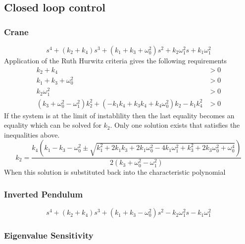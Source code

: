 \documentclass{article}
\begin{document}
\subsection{Closed loop control}


\subsubsection{Crane}


\begin{equation}
  s^{4} + \left(k_{2} + k_{4}\right) s^{3} + \left(k_{1} + k_{3} + \omega_{0}^{2}\right) s^{2} + k_{2} \omega_{1}^{2} s + k_{1} \omega_{1}^{2}
\end{equation}
Application of the Ruth Hurwitz criteria gives the following requirements
\begin{align}
  k_{2} + k_{4} &> 0 \\
  k_{1} + k_{3} + \omega_{0}^{2} &> 0 \\
  k_{2} \omega_{1}^{2} &> 0 \\
  \left(k_{3} + \omega_{0}^{2} - \omega_{1}^{2}\right) k_{2}^{2} + \left(- k_{1} k_{4} + k_{3} k_{4} + k_{4} \omega_{0}^{2}\right) k_{2} -  k_{1} k_{4}^{2} &> 0
\end{align}
If the system is at the limit of instablility then the last equality becomes an equality which can be solved for $k_2$. Only one solution exists that satisfies the inequalities above.
\begin{equation}
  k_2 = \frac{k_{4} \left(k_{1} - k_{3} - \omega_{0}^{2} \pm \sqrt{k_{1}^{2} + 2 k_{1} k_{3} + 2 k_{1} \omega_{0}^{2} - 4 k_{1} \omega_{1}^{2} + k_{3}^{2} + 2 k_{3} \omega_{0}^{2} + \omega_{0}^{4}}\right)}{2 \left(k_{3} + \omega_{0}^{2} - \omega_{1}^{2}\right)}
\end{equation}
When this solution is substituted back into the characteristic polynomial

\subsubsection{Inverted Pendulum}

\begin{equation}
  s^{4} + \left(k_{2} + k_{4}\right) s^{3} + \left(k_{1} + k_{3} - \omega_{0}^{2}\right) s^{2} -  k_{2} \omega_{1}^{2} s -  k_{1} \omega_{1}^{2}
\end{equation}


\subsubsection{Eigenvalue Sensitivity}
\end{document}
